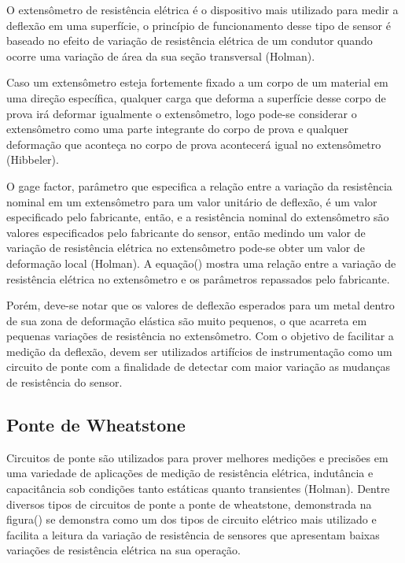 O extensômetro de resistência elétrica é o dispositivo mais utilizado para medir a deflexão em uma superfície, o princípio de funcionamento desse tipo de sensor é baseado no efeito de variação de resistência elétrica de um condutor quando ocorre uma variação de área da sua seção transversal (Holman).

Caso um extensômetro esteja fortemente fixado a um corpo de um material em uma direção específica, qualquer carga que deforma a superfície desse corpo de prova irá deformar igualmente o extensômetro, logo pode-se considerar o extensômetro como uma parte integrante do corpo de prova e qualquer deformação que aconteça no corpo de prova acontecerá igual no extensômetro (Hibbeler).

O gage factor, parâmetro que especifica a relação entre a variação da resistência nominal em um extensômetro para um valor unitário de deflexão, é um valor especificado pelo fabricante, então, e a resistência nominal do extensômetro são valores especificados pelo fabricante do sensor, então medindo um valor de variação de resistência elétrica no extensômetro pode-se obter um valor de deformação local (Holman). A equação() mostra uma relação entre a variação de resistência elétrica no extensômetro e os parâmetros repassados pelo fabricante.

Porém, deve-se notar que os valores de deflexão esperados para um metal dentro de sua zona de deformação elástica são muito pequenos, o que acarreta em pequenas variações de resistência no extensômetro. Com o objetivo de facilitar a medição da deflexão, devem ser utilizados artifícios de instrumentação como um circuito de ponte com a finalidade de detectar com maior variação as mudanças de resistência do sensor.

\subsection{Ponte de Wheatstone}

Circuitos de ponte são utilizados para prover melhores medições e precisões em uma variedade de aplicações de medição de resistência elétrica, indutância e capacitância sob condições tanto estáticas quanto transientes (Holman). Dentre diversos tipos de circuitos de ponte a ponte de wheatstone, demonstrada na figura() se demonstra como um dos tipos de circuito elétrico mais utilizado e facilita a leitura da variação de resistência de sensores que apresentam baixas variações de resistência elétrica na sua operação.

